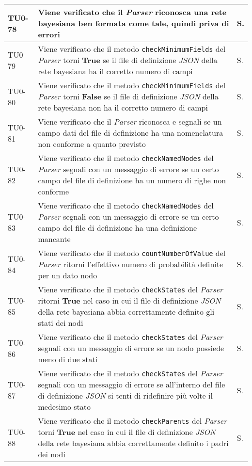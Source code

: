 \begin{longtable}{|C{.15\textwidth}|m{.66\textwidth}|C{.10\textwidth}|}
TU0-78 & Viene verificato che il \textit{Parser} riconosca una rete bayesiana ben formata come tale, quindi priva di errori & S. \\
\hline
{}TU0-79 & Viene verificato che il metodo \texttt{checkMinimumFields} del \textit{Parser} torni \textbf{True} se il file di definizione \textit{JSON} della rete bayesiana ha il corretto numero di campi & S.\\
\hline
TU0-80 & Viene verificato che il metodo \texttt{checkMinimumFields} del \textit{Parser} torni \textbf{False} se il file di definizione \textit{JSON} della rete bayesiana non ha il corretto numero di campi & S.\\
\hline
{}TU0-81 & Viene verificato che il \textit{Parser} riconosca e segnali se un campo dati del file di definizione ha una nomenclatura non conforme a quanto previsto & S.\\
\hline
TU0-82 & Viene verificato che il metodo \texttt{checkNamedNodes} del \textit{Parser} segnali con un messaggio di errore se un certo campo del file di definizione ha un numero di righe non conforme & S.\\
\hline
{}TU0-83 & Viene verificato che il metodo \texttt{checkNamedNodes} del \textit{Parser} segnali con un messaggio di errore se un certo campo del file di definizione ha una definizione mancante & S.\\
\hline
TU0-84 & Viene verificato che il metodo \texttt{countNumberOfValue} del \textit{Parser} ritorni l'effettivo numero di probabilità definite per un dato nodo & S.\\
\hline
{}TU0-85 & Viene verificato che il metodo \texttt{checkStates} del \textit{Parser} ritorni \textbf{True} nel caso in cui il file di definizione \textit{JSON} della rete bayesiana abbia correttamente definito gli stati dei nodi & S.\\
\hline
TU0-86 & Viene verificato che il metodo \texttt{checkStates} del \textit{Parser} segnali con un messaggio di errore se un nodo possiede meno di due stati & S.\\
\hline
{}TU0-87 & Viene verificato che il metodo \texttt{checkStates} del \textit{Parser} segnali con un messaggio di errore se all'interno del file di definizione \textit{JSON} si tenti di ridefinire più volte il medesimo stato & S.\\
\hline
TU0-88 & Viene verificato che il metodo \texttt{checkParents} del \textit{Parser} torni \textbf{True} nel caso in cui il file di definizione \textit{JSON} della rete bayesiana abbia correttamente definito i padri dei nodi & S.\\

\end{longtable}
